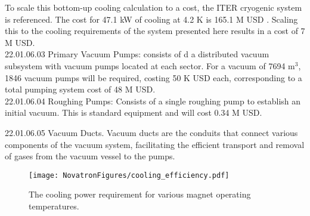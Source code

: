 To scale this bottom-up cooling calculation to a cost, the ITER cryogenic system is referenced. The cost for 47.1 kW of cooling at 4.2 K is 165.1 M USD \cite{waganer2006design, serio2010challenges}. Scaling this to the cooling requirements of the system presented here results in a cost of 7 M USD. \\

22.01.06.03 Primary Vacuum Pumps: consists of d a distributed vacuum subsystem with vacuum pumps located at each sector. For a vacuum of 7694 m$^3$, 1846 vacuum pumps will be required, costing 50 K USD each, corresponding to a total pumping system cost of 48 M USD.\\

22.01.06.04 Roughing Pumps: Consists of a single roughing pump to establish an initial vacuum. This is standard equipment and will cost 0.34 M USD.

22.01.06.05 Vacuum Ducts. Vacuum ducts are the conduits that connect various components of the vacuum system, facilitating the efficient transport and removal of gases from the vacuum vessel to the pumps.

\begin{figure}[h]
    \centering
    \texttt{[image: NovatronFigures/cooling\_efficiency.pdf]}
    \caption{The cooling power requirement for various magnet operating temperatures.}
    \label{fig:cool_eff}
\end{figure}